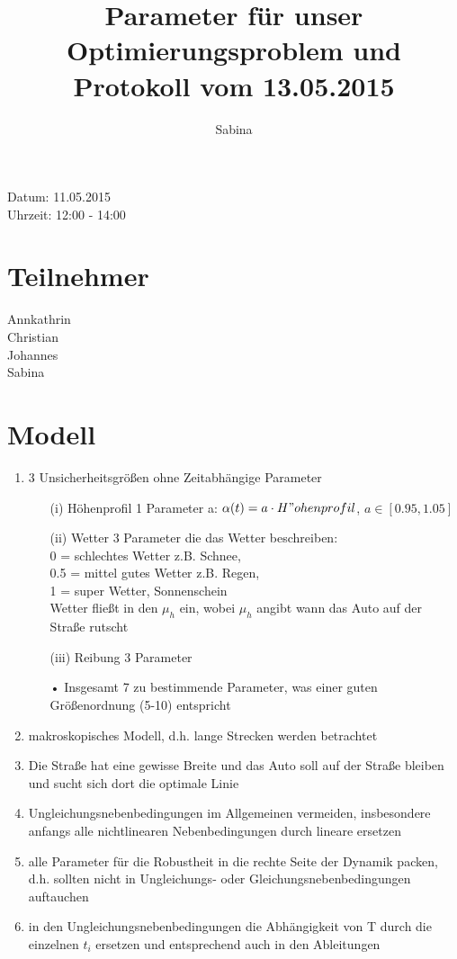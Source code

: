 \documentclass[12pt,a4paper]{article}
\theoremstyle{definition}
\theoremstyle{plain}
\begin{document}
	
\title{Parameter für unser Optimierungsproblem und Protokoll vom 13.05.2015}
\author{Sabina}
\maketitle

\noindent Datum: 11.05.2015\\
Uhrzeit: 12:00 - 14:00


\section{Teilnehmer}
Annkathrin\\
Christian\\
Johannes\\
Sabina

\section{Modell}
\begin{enumerate}
\item 3 Unsicherheitsgrößen ohne Zeitabhängige Parameter
\begin{enumerate}
\item[(i)] Höhenprofil 1 Parameter a: $\alpha(t) = a\cdot H"ohenprofil$, $a\in[0.95,1.05]$
\item[(ii)] Wetter 3 Parameter die das Wetter beschreiben:\\0 = schlechtes Wetter z.B. Schnee,\\ 0.5 = mittel gutes Wetter z.B. Regen,\\1 = super Wetter, Sonnenschein\\
Wetter fließt in den $\mu_h$ ein, wobei $\mu_h$ angibt wann das Auto auf der Straße rutscht
\item[(iii)] Reibung 3 Parameter
\item[•] Insgesamt 7 zu bestimmende Parameter, was einer guten Größenordnung (5-10) entspricht
\end{enumerate}
\item makroskopisches Modell, d.h. lange Strecken werden betrachtet
\item Die Straße hat eine gewisse Breite und das Auto soll auf der Straße bleiben und sucht sich dort die optimale Linie
\item Ungleichungsnebenbedingungen im Allgemeinen vermeiden, insbesondere anfangs alle nichtlinearen Nebenbedingungen durch lineare ersetzen
\item alle Parameter für die Robustheit in die rechte Seite der Dynamik packen, d.h. sollten nicht in Ungleichungs- oder Gleichungsnebenbedingungen auftauchen
\item in den Ungleichungsnebenbedingungen die Abhängigkeit von T durch die einzelnen $t_i$ ersetzen und entsprechend auch in den Ableitungen 
\end{enumerate}
\end{document}
